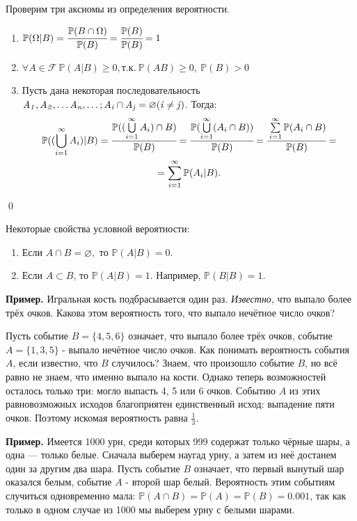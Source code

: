 \documentclass[oneside,final,14pt]{extreport}
\newcommand\myex{{\bf Пример.}}
\newcommand\myprob[1]{{\mathbb{P}(#1)}}
\renewenvironment{proof}{{\bfseries Доказательство.}}{\qed}
\theoremstyle{definition}
\begin{document}
\begin{proof}
    Проверим три аксиомы из определения вероятности.

\begin{enumerate}
    \item  \( \myprob{\Omega|B} = \cfrac{\myprob{B \cap \Omega}}{\myprob{B}} = \cfrac{\myprob{B}}{\myprob{B}} = 1\)
    \item \( \forall A \in \mathcal{F}~ \myprob{A|B} \geq 0, \text{т.к.}~ \myprob{AB} \geqslant 0,~ \myprob{B} > 0 \)
    \item Пусть дана некоторая последовательность $\it A_1, A_2, \ldots A_n, \ldots; A_i \cap A_j = \varnothing ({\it i \ne j})$. Тогда: 
    \begin{multline*}
        \myprob{(\bigcup\limits_{i=1}^\infty A_i)|B}  = \cfrac{\myprob{(\bigcup\limits_{i=1}^\infty A_i) \cap B}}{\myprob{B}} = \cfrac{\myprob{\bigcup\limits_{i=1}^\infty(A_i \cap B)}}{\myprob{B}} = \cfrac{\sum\limits_{i=1}^\infty \myprob{A_i \cap B}}{\myprob{B}} = \\
        = \sum\limits_{i=1}^\infty \myprob{A_i | B}.
    \end{multline*}
\end{enumerate}
\end{proof}

Некоторые свойства условной вероятности:
\begin{enumerate}
    \item Если $A \cap B = \varnothing,$ то $\myprob {A | B} = 0.$
    \item Если $A \subset B$, то $\myprob{A|B} = 1.$ Например, $\myprob{B|B} = 1.$
\end{enumerate}

\myex{} Игральная кость подбрасывается один раз. {\it Известно}, что
выпало более трёх очков. Какова { этом} вероятность того, что выпало
нечётное число очков?

Пусть событие $B = \{4, 5, 6\}$ означает, что выпало более трёх очков, событие $A = \{1, 3, 5\}$ - выпало нечётное число очков. Как понимать вероятность события $A$, если известно, что $B$ случилось? Знаем, что произошло событие $B$, но всё равно не знаем, что именно выпало на кости. Однако теперь возможностей осталось только три: могло выпасть 4, 5 или 6 очков. Событию $A$ из этих равновозможных исходов благоприятен единственный исход: выпадение пяти очков. Поэтому искомая вероятность равна $\frac{1}{3}$.

\myex{} Имеется 1000 урн, среди которых 999 содержат только
чёрные шары, а одна — только белые. Сначала выберем наугад урну, а затем
из неё достанем один за другим два шара. Пусть событие $B$ означает, что первый вынутый шар оказался белым, событие $A$ - второй шар белый. Вероятность этим событиям случиться одновременно мала: $\myprob{A \cap B} = \myprob{A} = \myprob{B} = 0.001$, так как только в одном случае из 1000 мы выберем урну с белыми шарами.
\end{document}
